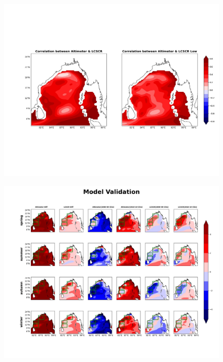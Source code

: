 \documentclass[review]{elsarticle}
\begin{document}
\begin{figure}[!t]
\centering
\includegraphics[scale=0.35]{images/corr_plot.jpeg}
\caption{}
\label{fig}
\end{figure}

\begin{figure}[!t]
\centering
\includegraphics[scale=0.35]{images/validation.jpeg}
\caption{}
\label{fig}
\end{figure}
\end{document}
